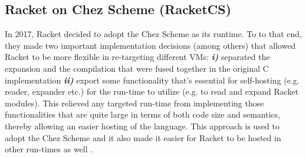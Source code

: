 \subsection[Racket on Chez Scheme]{Racket on Chez Scheme (RacketCS)}
\label{subsec:racketcs}

In 2017, Racket decided to adopt the Chez Scheme as its runtime. To to
that end, they made two important implementation decisions (among
others) that allowed Racket to be more flexible in re-targeting
different VMs: \textit{\textbf{i)}} separated the expansion and the
compilation that were fused together in the original C implementation
\textit{\textbf{ii)}} export some functionality that's essential for
self-hosting (e.g. reader, expander etc.) for the run-time to utilize
(e.g. to read and expand Racket modules). This relieved any targeted
run-time from implementing those functionalities that are quite large
in terms of both code size and semantics, thereby allowing an easier
hosting of the language. This approach is used to adopt the Chez
Scheme and it also made it easier for Racket to be hosted in other
run-times as well \cite{racket-on-chez-19}.
